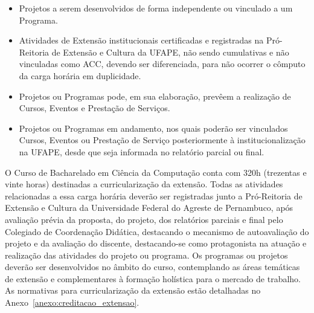 \documentclass[
	12pt,				%
	openright,			%
  oneside,     %
	a4paper,			%
	english,			%
	french,				%
	spanish,			%
	brazil				%
	]{abntex2}
\begin{document}
\begin{itemize}
   \item Projetos a serem desenvolvidos de forma independente ou vinculado a um Programa.
   \item Atividades de Extensão institucionais certificadas e registradas na Pró-Reitoria de Extensão e Cultura da UFAPE, não sendo cumulativas e não vinculadas como ACC, devendo ser diferenciada, para não ocorrer o cômputo da carga horária em duplicidade.
   \item Projetos ou Programas pode, em sua elaboração, prevêem a realização de Cursos, Eventos e Prestação de Serviços.
   \item Projetos ou Programas em andamento, nos quais poderão ser vinculados Cursos, Eventos ou Prestação de Serviço posteriormente à institucionalização na UFAPE, desde que seja informada no relatório parcial ou final.
\end{itemize}

O Curso de Bacharelado em Ciência da Computação conta com 320h (trezentas e vinte horas) destinadas a curricularização da extensão. Todas as atividades relacionadas a essa carga horária deverão ser registradas junto a Pró-Reitoria de Extensão e Cultura da Universidade Federal do Agreste de Pernambuco, após avaliação prévia da proposta, do projeto, dos relatórios parciais e final pelo Colegiado de Coordenação Didática, destacando o mecanismo de autoavaliação do projeto e da avaliação do discente, destacando-se como protagonista na atuação e realização das atividades do projeto ou programa. Os programas ou projetos deverão ser desenvolvidos no âmbito do curso, contemplando as áreas temáticas de extensão e complementares à formação holística para o mercado de trabalho. As normativas para curricularização da extensão estão detalhadas no Anexo~\ref{anexo:creditacao_extensao}.



%
%
\end{document}
